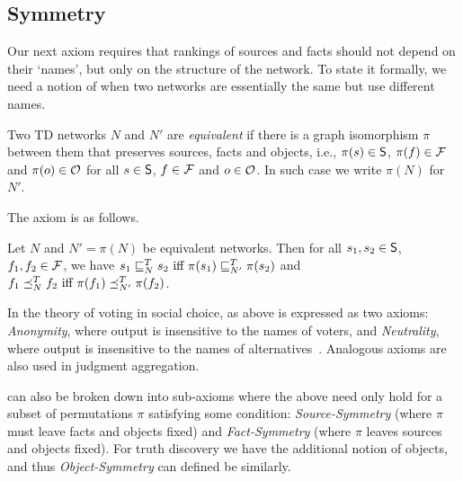 \subsection{Symmetry}

Our next axiom requires that rankings of sources and facts should not depend on
their `names', but only on the structure of the network. To state it formally,
we need a notion of when two networks are essentially the same but use
different names.

\begin{definition}
Two TD networks $N$ and $N'$ are \emph{equivalent} if there is a
graph isomorphism $\pi$ between them that preserves sources, facts and objects,
i.e., $\pi(s) \in \S$, $\pi(f) \in \F$ and $\pi(o) \in \O$ for all $s \in \S$,
$f \in \F$ and $o \in \O$. In such case we write $\pi(N)$ for $N'$.
\end{definition}

The axiom is as follows.

\begin{axiom}[\symmetry{}]
Let $N$ and $N' = \pi(N)$ be equivalent networks. Then for all $s_1, s_2 \in
\S$, $f_1, f_2 \in \F$, we have
    $s_1 \sle_N^T s_2\ \textrm{iff } \pi(s_1) \sle_{N'}^T \pi(s_2)$
and
    $f_1 \fle_N^T f_2\ \textrm{iff } \pi(f_1) \fle_{N'}^T \pi(f_2)$.

\end{axiom}

In the theory of voting in social choice, \symmetry{} as above is expressed as two
axioms: \emph{Anonymity}, where output is insensitive to the names of voters,
and \emph{Neutrality}, where output is insensitive to the names of
alternatives~\cite{zwicker2016voting}. Analogous axioms are also used in
judgment aggregation.

\symmetry{} can also be broken down into sub-axioms where the above
need only hold for a subset of permutations $\pi$ satisfying some condition:
\emph{Source-Symmetry} (where $\pi$ must leave facts and objects fixed) and
\emph{Fact-Symmetry} (where $\pi$ leaves sources and objects fixed). For truth
discovery we have the additional notion of objects, and thus
\emph{Object-Symmetry} can defined be similarly.


